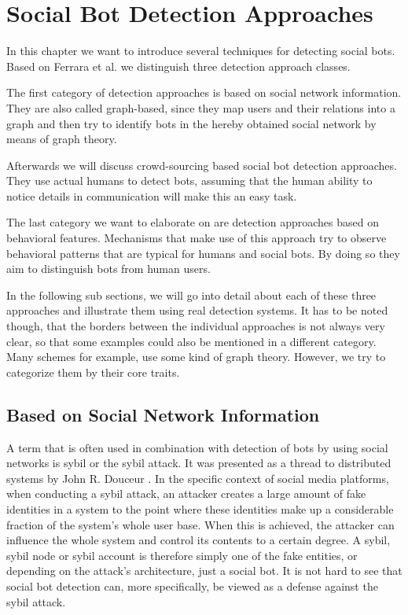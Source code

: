 



\section{Social Bot Detection Approaches}
In this chapter we want to introduce several techniques for detecting social bots. Based on Ferrara et al. \cite{ferrara15} we distinguish three detection approach classes. 

The first category of detection approaches is based on social network information. They are also called graph-based, since they map users and their relations into a graph and then try to identify bots in the hereby obtained social network by means of graph theory. 

Afterwards we will discuss crowd-sourcing based social bot detection approaches. They use actual humans to detect bots, assuming that the human ability to notice details in communication will make this an easy task.

The last category we want to elaborate on are detection approaches based on behavioral features. Mechanisms that make use of this approach try to observe behavioral patterns that are typical for humans and social bots. By doing so they aim to distinguish bots from human users. 

In the following sub sections, we will go into detail about each of these three approaches and illustrate them using real detection systems. It has to be noted though, that the borders between the individual approaches is not always very clear, so that some examples could also be mentioned in a different category. Many schemes for example, use some kind of graph theory. However, we try to categorize them by their core traits.

\subsection{Based on Social Network Information}
A term that is often used in combination with detection of bots by using social networks is sybil or the sybil attack. It was presented as a thread to distributed systems by John R. Douceur \cite{sybil}. In the specific context of social media platforms, when conducting a sybil attack, an attacker creates a large amount of fake identities in a system to the point where these identities make up a considerable fraction of the system's whole user base. When this is achieved, the attacker can influence the whole system and control its contents to a certain degree. A sybil, sybil node or sybil account is therefore simply one of the fake entities, or depending on the attack's architecture, just a social bot. It is not hard to see that social bot detection can, more specifically, be viewed as a defense against the sybil attack.   

